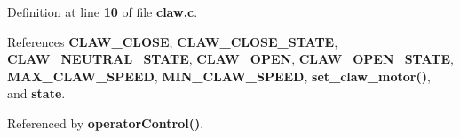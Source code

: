 Definition at line \textbf{ 10} of file \textbf{ claw.\+c}.



References \textbf{ C\+L\+A\+W\+\_\+\+C\+L\+O\+SE}, \textbf{ C\+L\+A\+W\+\_\+\+C\+L\+O\+S\+E\+\_\+\+S\+T\+A\+TE}, \textbf{ C\+L\+A\+W\+\_\+\+N\+E\+U\+T\+R\+A\+L\+\_\+\+S\+T\+A\+TE}, \textbf{ C\+L\+A\+W\+\_\+\+O\+P\+EN}, \textbf{ C\+L\+A\+W\+\_\+\+O\+P\+E\+N\+\_\+\+S\+T\+A\+TE}, \textbf{ M\+A\+X\+\_\+\+C\+L\+A\+W\+\_\+\+S\+P\+E\+ED}, \textbf{ M\+I\+N\+\_\+\+C\+L\+A\+W\+\_\+\+S\+P\+E\+ED}, \textbf{ set\+\_\+claw\+\_\+motor()}, and \textbf{ state}.



Referenced by \textbf{ operator\+Control()}.

